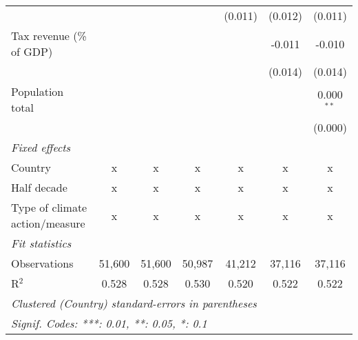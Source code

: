 \begin{tabular}{lcccccc}
                                                     &              &               &              & (0.011)        & (0.012)        & (0.011)\\   
   Tax revenue (\% of GDP)                           &              &               &              &                & -0.011         & -0.010\\   
                                                     &              &               &              &                & (0.014)        & (0.014)\\   
   Population total                                  &              &               &              &                &                & 0.000$^{**}$\\   
                                                     &              &               &              &                &                & (0.000)\\   
   \emph{Fixed effects}\\
   Country                                           & x            & x             & x            & x              & x              & x\\  
   Half decade                                       & x            & x             & x            & x              & x              & x\\  
   Type of climate action/measure                    & x            & x             & x            & x              & x              & x\\  
   \midrule \emph{Fit statistics}\\
   Observations                                      & 51,600       & 51,600        & 50,987       & 41,212         & 37,116         & 37,116\\  
   R$^2$                                             & 0.528        & 0.528         & 0.530        & 0.520          & 0.522          & 0.522\\  
   \midrule
   \multicolumn{7}{l}{\emph{Clustered (Country) standard-errors in parentheses}}\\
   \multicolumn{7}{l}{\emph{Signif. Codes: ***: 0.01, **: 0.05, *: 0.1}}\\
\end{tabular}
\par\endgroup


